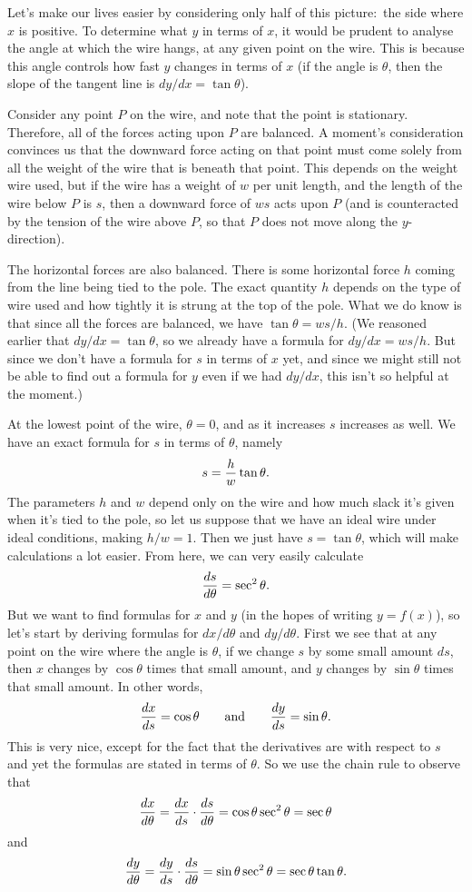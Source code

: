 Let's make our lives easier by considering only half of this picture:~the side where $x$ is positive.
To determine what $y$ in terms of $x$, it would be prudent to analyse the angle at which the wire hangs,
at any given point on the wire. This is because this angle controls how fast $y$ changes in terms of $x$
(if the angle is $\theta$, then the slope of the tangent line is $dy/dx = \tan \theta$).

Consider any point $P$ on the wire, and note that the point is stationary. Therefore, all of the forces
acting upon $P$ are balanced. A moment's consideration convinces us that the downward force
acting on that point must come solely from all the weight of the wire that is beneath that point.
This depends on the weight wire used, but if the wire has a weight of $w$ per unit length, and the
length of the wire below $P$ is $s$, then a downward force of $ws$ acts upon $P$ (and is counteracted
by the tension of the wire above $P$, so that $P$ does not move along the $y$-direction).

The horizontal forces are also balanced. There is some horizontal force $h$ coming from the line being tied
to the pole. The exact quantity $h$ depends on the type of wire
used and how tightly it is strung at the top of the pole. What we do know is that since all the forces
are balanced, we have $\tan\theta = ws/h$. (We reasoned earlier that $dy/dx = \tan\theta$, so we already
have a formula for $dy/dx = ws/h$. But since we don't have a formula for $s$ in terms of $x$ yet, and
since we might still not be able to find out a formula for $y$ even if we had $dy/dx$, this isn't so helpful
at the moment.)

At the lowest point of the wire, $\theta = 0$, and as it increases $s$ increases as well.
We have an exact formula for $s$ in terms of $\theta$, namely
$$ s= {h\over w} \tan \theta.$$
The parameters $h$ and $w$ depend only on the wire and how much slack it's given when it's tied to the pole,
so let us suppose that we have an ideal wire under ideal conditions, making $h/w = 1$. Then we just
have $s = \tan \theta$, which will make calculations a lot easier. From here, we can very easily
calculate
$${ds\over d\theta} = \sec^2\theta.$$
But we want to find formulas for $x$ and $y$ (in the hopes
of writing $y=f(x)$), so let's start by deriving formulas for $dx/d\theta$ and $dy/d\theta$. First we see that
at any point on the wire where the angle is $\theta$, if we change $s$ by some small amount $ds$,
then $x$ changes by $\cos\theta$ times that small amount, and $y$
changes by $\sin\theta$ times that small amount. In other words,
$${dx\over ds} = \cos\theta\qquad\hbox{and}\qquad {dy\over ds} = \sin\theta.$$
This is very nice, except for the fact that the derivatives are with respect to $s$ and yet the formulas
are stated in terms of $\theta$. So we use the chain rule to observe that
$${dx\over d\theta} = {dx\over ds}\cdot {ds\over d\theta} = \cos\theta \sec^2\theta = \sec\theta$$
and
$${dy\over d\theta} = {dy\over ds}\cdot {ds\over d\theta} = \sin\theta\sec^2\theta = \sec\theta\tan\theta.$$

